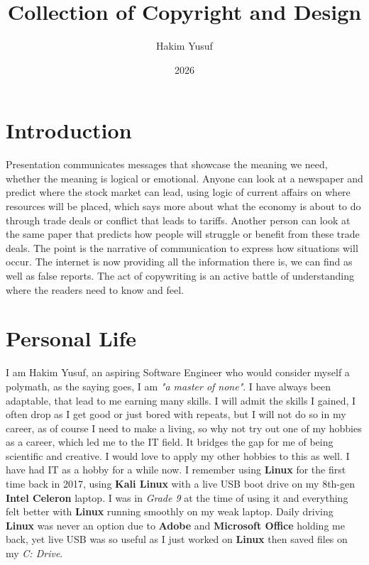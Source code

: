 \documentclass[12pt]{article}
\title{Collection of Copyright and Design}
\author{Hakim Yusuf}
\date{2026}
\begin{document}
\maketitle

\newpage
\tableofcontents

\newpage
\section{Introduction}

Presentation communicates messages that showcase the meaning we need, whether the meaning is logical or emotional. Anyone can look at a newspaper and predict where the stock market can lead, using logic of current affairs on where resources will be placed, which says more about what the economy is about to do through trade deals or conflict that leads to tariffs. Another person can look at the same paper that predicts how people will struggle or benefit from these trade deals. The point is the narrative of communication to express how situations will occur. The internet is now providing all the information there is, we can find as well as false reports. The act of copywriting is an active battle of understanding where the readers need to know and feel.

\section{Personal Life}

I am Hakim Yusuf, an aspiring Software Engineer who would consider myself a polymath, as the saying goes, I am \textit{"a master of none"}. I have always been adaptable, that lead to me earning many skills. I will admit the skills I gained, I often drop as I get good or just bored with repeats, but I will not do so in my career, as of course I need to make a living, so why not try out one of my hobbies as a career, which led me to the IT field. It bridges the gap for me of being scientific and creative. I would love to apply my other hobbies to this as well. I have had IT as a hobby for a while now. I remember using \textbf{Linux} for the first time back in 2017, using \textbf{Kali Linux} with a live USB boot drive on my 8th-gen \textbf{Intel Celeron} laptop. I was in \textit{Grade 9} at the time of using it and everything felt better with \textbf{Linux} running smoothly on my weak laptop. Daily driving \textbf{Linux} was never an option due to \textbf{Adobe} and \textbf{Microsoft Office} holding me back, yet live USB was so useful as I just worked on \textbf{Linux} then saved files on my \textit{C: Drive}. \\
\end{document}
